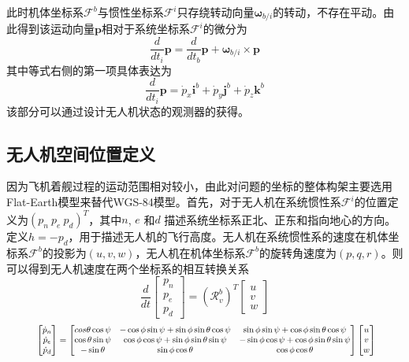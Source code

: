 此时机体坐标系$\mathcal{F}^b$与惯性坐标系$\mathcal{F}^i$只存绕转动向量$\mathbf{\omega}_{b/i}$的转动，不存在平动。由此得到该运动向量$\mathbf{p}$相对于系统坐标系$\mathcal{F}^i$的微分为
\begin{equation} \label{chp02_vector_derivative}
	\frac{d}{dt_i} \mathbf{p} = \frac{d}{dt_b} \mathbf{p} + \mathbf{\omega}_{b/i} \times \mathbf{p}
\end{equation}
其中等式右侧的第一项具体表达为
\begin{equation}
	\frac{d}{dt_i} \mathbf{p} = \dot{p}_x \mathbf{i}^b +  \dot{p}_y \mathbf{j}^b +  \dot{p}_z \mathbf{k}^b
\end{equation}
该部分可以通过设计无人机状态的观测器的获得。

\subsection{无人机空间位置定义}
因为飞机着舰过程的运动范围相对较小，由此对问题的坐标的整体构架主要选用Flat-Earth模型来替代WGS-84模型。首先，对于无人机在系统惯性系$\mathcal{F}^i$的位置定义为$(p_n\ p_e\ p_d)^T$，其中$n$, $e$  和$d$ 描述系统坐标系正北、正东和指向地心的方向。定义$h = -p_d$，用于描述无人机的飞行高度。无人机在系统惯性系的速度在机体坐标系$\mathcal{F}^b$的投影为$(u, v, w)$，无人机在机体坐标系$\mathcal{F}^b$的旋转角速度为$(p, q, r)$。则可以得到无人机速度在两个坐标系的相互转换关系
\begin{equation}
	\frac{d}{dt} \begin{bmatrix} p_n \\ p_e \\ p_d \end{bmatrix}   =  (\mathcal{R}_v^b)^T \begin{bmatrix} u \\  v \\ w \end{bmatrix}  
\end{equation}
\begin{equation}
	\resizebox{.9 \textwidth}{!} 
	{ $
		\begin{bmatrix} \dot{p}_n \\ \dot{p}_e \\ \dot{p}_d \end{bmatrix} = \begin{bmatrix}  cos \theta \cos \psi   &     -\cos\phi \sin\psi + \sin\phi \sin\theta \cos\psi                        &  \sin\phi \sin\psi + \cos\phi \sin\theta \cos\psi       \\
		\cos\theta \sin\psi    & \cos\phi \cos\psi + \sin\phi \sin\theta\sin\psi   & -\sin\phi \cos\psi + \cos\phi \sin\theta \sin\psi \\
		-\sin\theta  & \sin\phi \cos\theta & \cos\phi \cos\theta
		\end{bmatrix} \begin{bmatrix} u \\  v \\ w \end{bmatrix}
		$}
\end{equation}
